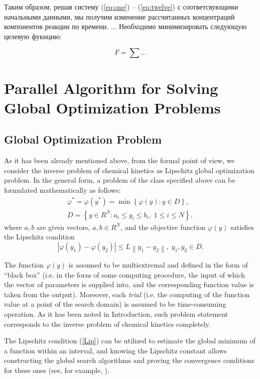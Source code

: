 \documentclass{svproc}
\begin{document}
Таким образом, решая систему (\ref{eq:one}) -- (\ref{eq:twelve}) с соответсвующими начальными данными, мы получим изменение рассчитанных концентраций компонентов реакции по времени. ...
Необходимо минимизировать следующую целевую фукнцию:

\begin{equation}
  F = \sum ...
  \label{eq:objective_func}
\end{equation}


\section{Parallel Algorithm for Solving Global Optimization Problems }\label{Sec_GSA}

\subsection{Global Optimization Problem}

As it has been already mentioned above, from the formal point of view, we consider the inverse problem of chemical kinetics as Lipschitz global optimization problem. In the general form, a problem of the class specified above can be formulated mathematically as 
follows:
\begin{gather}
 \varphi^* = \varphi(y^\ast)=\min{\left\{\varphi(y):y\in D\right\}}, \label{problemN}\\
 D=\left\{y\in R^N: a_i\leq y_i \leq b_i, \;  1\leq i \leq N\right\} \label{D},
\end{gather}
where $a,b$ are given vectors, $a,b\in R^N$, and the objective function $\varphi(y)$ satisfies the Lipschitz condition
\begin{equation}\label{Lip}
\left|\varphi(y_1)-\varphi(y_2)\right|\leq L\left\|y_1-y_2\right\|,\; y_1,y_2 \in D.
\end{equation}

The function $\varphi(y)$ is assumed to be multiextremal and defined in the form of ``black box'' (i.e. in the form of some computing procedure, the input of which the  vector of parameters is supplied into, and the corresponding function value is taken from the output). Moreover, each \textit{trial} (i.e. the computing of the function value at a point of the search domain) is assumed to be time-consuming operation. 
As it has been noted in Introduction, such problem statement corresponds to the inverse problem of chemical kinetics completely.

The Lipschitz condition (\ref{Lip}) can be utilized to estimate the global minimum of a function within an interval, and knowing the Lipschitz constant allows constructing the global search algorithms and proving the convergence conditions for these ones (see, for example, \cite{Strongin2000}).
\end{document}
